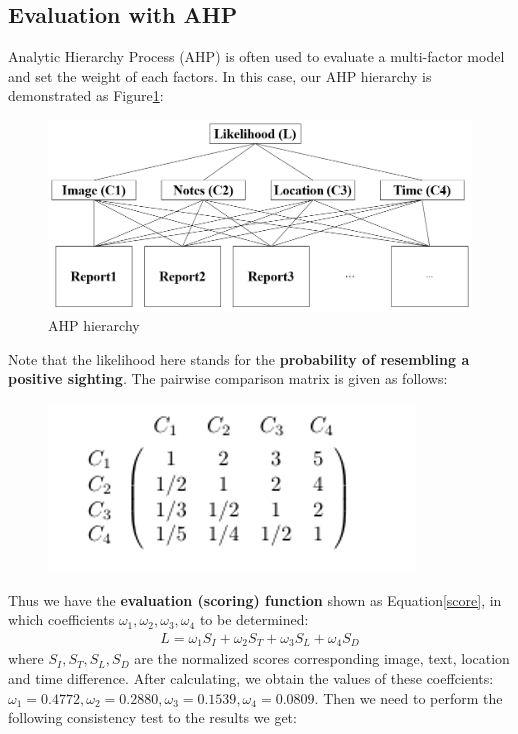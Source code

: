 \documentclass{mcmthesis}
\begin{document}
	\subsection{Evaluation with AHP}
	\quad Analytic Hierarchy Process (AHP) is often used to evaluate a multi-factor model and set the weight of each factors. In this case, our AHP hierarchy is demonstrated as Figure\ref{AHP}:\\
	\begin{figure}[h]
		\centering
		\includegraphics[scale=0.5]{AHP.png}
		\caption{AHP hierarchy}
		\label{AHP}
	\end{figure}
	Note that the likelihood here stands for the \textbf{probability of resembling a positive sighting}. The pairwise comparison matrix is given as follows:\\
	\begin{figure}[H]
		\centering
		\includegraphics[scale=0.8]{m.png}
	\end{figure}
	Thus we have the \textbf{evaluation (scoring) function} shown as Equation\ref{score}, in which coefficients $\omega_1,\omega_2,\omega_3,\omega_4$ to be determined:
	\begin{align}
		L = \omega_1S_I + \omega_2S_T + \omega_3S_L + \omega_4S_{D}
		\label{score}
	\end{align}
	where $S_I,S_T,S_L,S_D$ are the normalized scores corresponding image, text, location and time difference. After calculating, we obtain the values of these coeffcients: $\omega_1 = 0.4772,\omega_2 = 0.2880,\omega_3 = 0.1539,\omega_4 = 0.0809$. Then we need to perform the following consistency test to the results we get:
\end{document}
